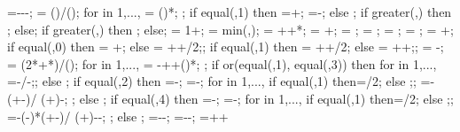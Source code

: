 {{\rightsoily=\rightwallh-\rightsoildepth-\supportheight-\hsdistbottom;
\isospace = (\buildingwidth)/();
for \kiso in {1,...,{\numberofisolators}}{
\xiso{\kiso} = ()*\isospace;
};
if equal(\isoshiftyn,1) then
{=+\isoshift;
\xiso{\numberofisolators}=\xiso{\numberofisolators}-\isoshift;}
else {};
if greater(\doflocfloor,\storynumber) then {;} else{};
if greater(\dofloccolumn,\columnnumber) then {;} else{};
\dofloch = 1+\doflocfloor;
\minlen = min(\storyheight,\baywidth);
\dofxx = \x{\dofloccolumn}+\dofoffsetratio*\minlen+*\showdefl;
\dofyy = \y{\dofloch}+\dofoffsetratio*\minlen;
\arrlen = \arrowlenratio*\minlen;
\arrrad = \rotarrowlenratio*\minlen;
\Xaxesstarty = ;
\Yaxesstartx = ;
\Yaxesstarty = \y{\levelnumber}+\axisseperation;
if equal(\showsupports,0) then
{\Xaxesstartx = \x{\columnnumber}+\axisseperation;} else
{\Xaxesstartx = \x{\columnnumber}+\axisseperation+\supportwidth/2;};
if equal(\showsupports,1) then
{\Xaxesstartx = \x{\columnnumber}+\axisseperation+\supportwidth/2;} else
{\Xaxesstartx = \x{\columnnumber}+\axisseperation+\supportwidth;};
\pilecoordy = -\supportheight;
\pilespace = 
(2*\supportwidth+*\pilesidespace)/();
for \pileind in {1,...,{\numberofpiles}}{
\pilecoordx{\pileind} = -\supportwidth+\pilesidespace+()*\pilespace;
};
if or(equal(\latloadtype,1), equal(\latloadtype,3)) then {
for \iarr in {1,...,{\levelnumber}}{
	\arrstartx{\iarr}=-\toparrlen*\y{\iarr}/\structheight-\latloadshift;};
} else {};
if equal(\latloadtype,2) then {
	=-\latloadshift;
	=-\isomidy;
	for \iarr in {1,...,{\levelnumber}}{
		if equal(\iarr,1) then{\addtempy=\supportheight/2;} else {;};
		\arrstartx{\iarr}=-\toparrlen*(\y{\iarr}+\isomidy-\addtempy)/
		(\structheight+\isomidy)-\latloadshift;
	};
} else {};
if equal(\latloadtype,4) then {
	=-\latloadshift;
	=-\isomidy;
	for \iarr in {1,...,{\levelnumber}}{
		if equal(\iarr,1) then{\addtempy=\supportheight/2;} else {;};
		\arrstartx{\iarr}=-(\toparrlen-\basearrlen)*(\y{\iarr}+\isomidy-\addtempy)/
		(\structheight+\isomidy)-\latloadshift-\basearrlen;
	};
} else {};
\engbedrockstartx=-\leftsoildist-\engbedrockleftdist;
\engbedrockstarty=-\soilbelowfoundtof-\engbedrockdepth;
\engbedrockdeltax=\leftsoildist+\engbedrockleftdist+
}}
